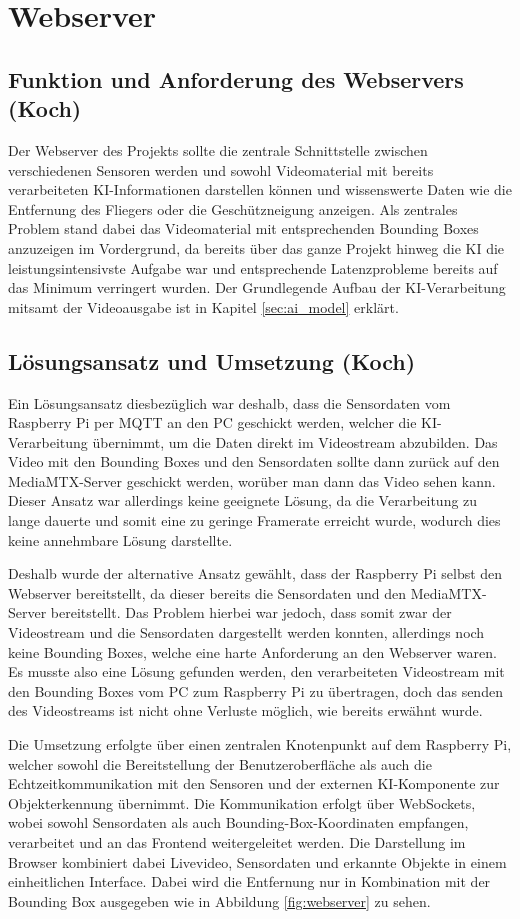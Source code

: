 \chapter{Webserver}
\label{sec:Webserver}
\section{Funktion und Anforderung des Webservers (Koch)}
Der Webserver des Projekts sollte die zentrale Schnittstelle zwischen verschiedenen Sensoren werden und sowohl Videomaterial mit bereits verarbeiteten KI-Informationen darstellen können und wissenswerte Daten wie die Entfernung des Fliegers oder die Geschützneigung anzeigen.
Als zentrales Problem stand dabei das Videomaterial mit entsprechenden Bounding Boxes anzuzeigen im Vordergrund, da bereits über das ganze Projekt hinweg die KI die leistungsintensivste Aufgabe war und entsprechende Latenzprobleme bereits auf das Minimum verringert wurden.
Der Grundlegende Aufbau der KI-Verarbeitung mitsamt der Videoausgabe ist in Kapitel \ref{sec:ai_model} erklärt.

\section{Lösungsansatz und Umsetzung (Koch)}
Ein Lösungsansatz diesbezüglich war deshalb, dass die Sensordaten vom Raspberry Pi per MQTT an den PC geschickt werden, welcher die KI-Verarbeitung übernimmt, um die Daten direkt im Videostream abzubilden.
Das Video mit den Bounding Boxes und den Sensordaten sollte dann zurück auf den MediaMTX-Server geschickt werden, worüber man dann das Video sehen kann.
Dieser Ansatz war allerdings keine geeignete Lösung, da die Verarbeitung zu lange dauerte und somit eine zu geringe Framerate erreicht wurde, wodurch dies keine annehmbare Lösung darstellte.


Deshalb wurde der alternative Ansatz gewählt, dass der Raspberry Pi selbst den Webserver bereitstellt, da dieser bereits die Sensordaten und den MediaMTX-Server bereitstellt.
Das Problem hierbei war jedoch, dass somit zwar der Videostream und die Sensordaten dargestellt werden konnten, allerdings noch keine Bounding Boxes, welche eine harte Anforderung an den Webserver waren.
Es musste also eine Lösung gefunden werden, den verarbeiteten Videostream mit den Bounding Boxes vom PC zum Raspberry Pi zu übertragen, doch das senden des Videostreams ist nicht ohne Verluste möglich, wie bereits erwähnt wurde.

Die Umsetzung erfolgte über einen zentralen Knotenpunkt auf dem Raspberry Pi, welcher sowohl die Bereitstellung der Benutzeroberfläche als auch die Echtzeitkommunikation mit den Sensoren und der externen KI-Komponente zur Objekterkennung übernimmt. Die Kommunikation erfolgt über WebSockets, wobei sowohl Sensordaten als auch Bounding-Box-Koordinaten empfangen, verarbeitet und an das Frontend weitergeleitet werden. Die Darstellung im Browser kombiniert dabei Livevideo, Sensordaten und erkannte Objekte in einem einheitlichen Interface. 
Dabei wird die Entfernung nur in Kombination mit der Bounding Box ausgegeben wie in Abbildung \ref{fig:webserver} zu sehen.

